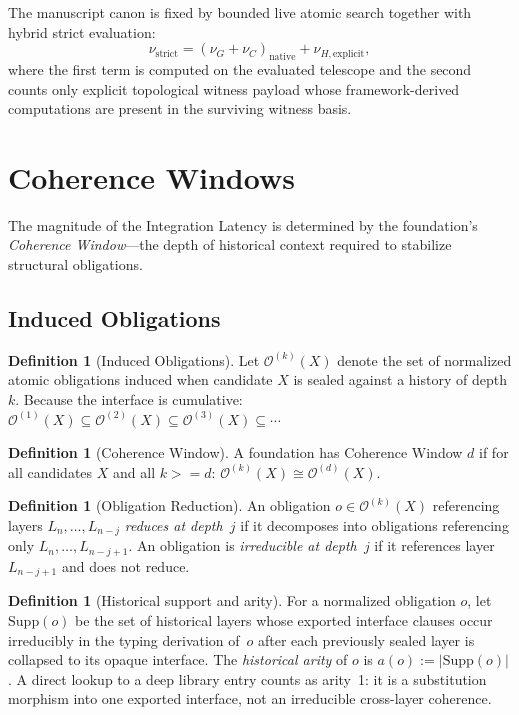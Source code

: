 \documentclass[11pt,a4paper]{article}
\def\geq{>=}%
\theoremstyle{plain}
\theoremstyle{definition}
\newtheorem{definition}[theorem]{Definition}
\theoremstyle{remark}
\begin{document}
The manuscript canon is fixed by bounded live atomic search together with hybrid strict evaluation:
\[
  \nu_{\mathrm{strict}} = (\nu_G+\nu_C)_{\mathrm{native}} + \nu_{H,\mathrm{explicit}},
\]
where the first term is computed on the evaluated telescope and the second counts only explicit topological witness payload whose framework-derived computations are present in the surviving witness basis.

\section{Coherence Windows}
\label{sec:coherence}

The magnitude of the Integration Latency is determined by the foundation's \emph{Coherence Window}---the depth of historical context required to stabilize structural obligations.

\subsection{Induced Obligations}

\begin{definition}[Induced Obligations]
\label{def:obligations}
Let $\mathcal{O}^{(k)}(X)$ denote the set of normalized atomic obligations induced when candidate $X$ is sealed against a history of depth $k$.
Because the interface is cumulative:
$\mathcal{O}^{(1)}(X) \subseteq \mathcal{O}^{(2)}(X) \subseteq \mathcal{O}^{(3)}(X) \subseteq \cdots$
\end{definition}

\begin{definition}[Coherence Window]
\label{def:window}
A foundation has Coherence Window $d$ if for all candidates $X$ and all $k \geq d$:
$\mathcal{O}^{(k)}(X) \cong \mathcal{O}^{(d)}(X)$.
\end{definition}

\begin{definition}[Obligation Reduction]
\label{def:reduction}
An obligation $o \in \mathcal{O}^{(k)}(X)$ referencing layers $L_n, \ldots, L_{n-j}$ \emph{reduces at depth~$j$} if it decomposes into obligations referencing only $L_n, \ldots, L_{n-j+1}$.
An obligation is \emph{irreducible at depth~$j$} if it references layer $L_{n-j+1}$ and does not reduce.
\end{definition}

\begin{definition}[Historical support and arity]
\label{def:arity}
For a normalized obligation $o$, let $\mathrm{Supp}(o)$ be the set of historical layers whose exported interface clauses occur irreducibly in the typing derivation of~$o$ after each previously sealed layer is collapsed to its opaque interface.
The \emph{historical arity} of $o$ is $a(o) := |\mathrm{Supp}(o)|$.
A direct lookup to a deep library entry counts as arity~1: it is a substitution morphism into one exported interface, not an irreducible cross-layer coherence.
\end{definition}
\end{document}
